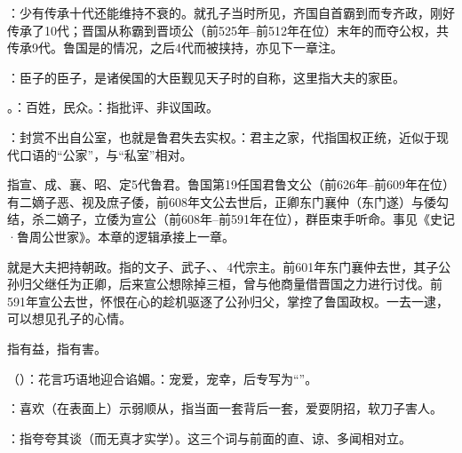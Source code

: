 {\item {}：少有传承十代还能维持不衰的。就孔子当时所见，齐国自首霸到而专齐政，刚好传承了10代；晋国从称霸到晋顷公（前525年--前512年在位）末年的而夺公权，共传承9代。鲁国是的情况，之后4代而被挟持，亦见下一章注。
\item {}：臣子的臣子，是诸侯国的大臣觐见天子时的自称，这里指大夫的家臣。
\item {}。：百姓，民众。：指批评、非议国政。
}
{}


{
\item {}：封赏不出自公室，也就是鲁君失去实权。：君主之家，代指国权正统，近似于现代口语的“公家”，与“私室”相对。

指宣、成、襄、昭、定5代鲁君。鲁国第19任国君鲁文公（前626年--前609年在位）有二嫡子恶、视及庶子倭，前608年文公去世后，正卿东门襄仲（东门遂）与倭勾结，杀二嫡子，立倭为宣公（前608年--前591年在位），群臣束手听命。事见《史记·鲁周公世家》。本章的逻辑承接上一章。

\item {}就是大夫把持朝政。指的文子、武子、、\,4代宗主。前601年东门襄仲去世，其子公孙归父继任为正卿，后来宣公想除掉三桓，曾与他商量借晋国之力进行讨伐。前591年宣公去世，怀恨在心的趁机驱逐了公孙归父，掌控了鲁国政权。一去一逮，可以想见孔子的心情。
}
{}


{
\item {}指有益，指有害。
\item {}（）：花言巧语地迎合谄媚。：宠爱，宠幸，后专写为“”。
\item {}：喜欢（在表面上）示弱顺从，指当面一套背后一套，爱耍阴招，软刀子害人。
\item {}：指夸夸其谈（而无真才实学）。这三个词与前面的直、谅、多闻相对立。
}
{}


